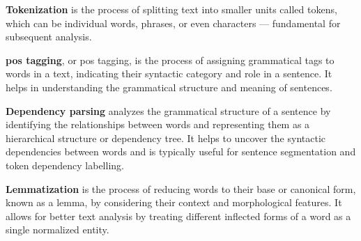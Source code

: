 \begin{compactenum}[a)]
    \item \textbf{Tokenization} is the process of splitting text into smaller units called tokens, which can be individual words, phrases, or even characters --- fundamental for subsequent analysis.
    \item \textbf{\acl{pos} tagging}, or \acs{pos} tagging, is the process of assigning grammatical tags to words in a text, indicating their syntactic category and role in a sentence. It helps in understanding the grammatical structure and meaning of sentences.
    \item \textbf{Dependency parsing} analyzes the grammatical structure of a sentence by identifying the relationships between words and representing them as a hierarchical structure or dependency tree. It helps to uncover the syntactic dependencies between words and is typically useful for sentence segmentation and token dependency labelling.
    \item \textbf{Lemmatization} is the process of reducing words to their base or canonical form, known as a lemma, by considering their context and morphological features. It allows for better text analysis by treating different inflected forms of a word as a single normalized entity.
\end{compactenum}